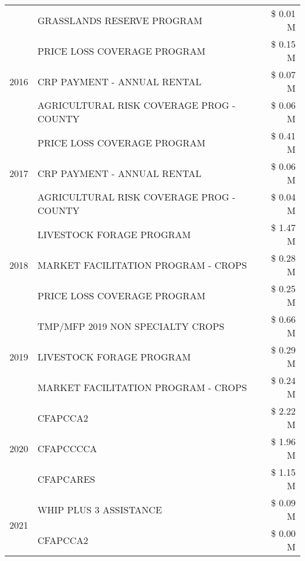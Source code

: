 \begin{tabular}{llr}
 & GRASSLANDS RESERVE PROGRAM & \$ 0.01 M \\
\cline{1-3}
\multirow[t]{3}{*}{2016} & PRICE LOSS COVERAGE PROGRAM & \$ 0.15 M \\
 & CRP PAYMENT - ANNUAL RENTAL & \$ 0.07 M \\
 & AGRICULTURAL RISK COVERAGE PROG - COUNTY & \$ 0.06 M \\
\cline{1-3}
\multirow[t]{3}{*}{2017} & PRICE LOSS COVERAGE PROGRAM & \$ 0.41 M \\
 & CRP PAYMENT - ANNUAL RENTAL & \$ 0.06 M \\
 & AGRICULTURAL RISK COVERAGE PROG - COUNTY & \$ 0.04 M \\
\cline{1-3}
\multirow[t]{3}{*}{2018} & LIVESTOCK FORAGE PROGRAM & \$ 1.47 M \\
 & MARKET FACILITATION PROGRAM - CROPS & \$ 0.28 M \\
 & PRICE LOSS COVERAGE PROGRAM & \$ 0.25 M \\
\cline{1-3}
\multirow[t]{3}{*}{2019} & TMP/MFP 2019 NON SPECIALTY CROPS & \$ 0.66 M \\
 & LIVESTOCK FORAGE PROGRAM & \$ 0.29 M \\
 & MARKET FACILITATION PROGRAM - CROPS & \$ 0.24 M \\
\cline{1-3}
\multirow[t]{3}{*}{2020} & CFAPCCA2 & \$ 2.22 M \\
 & CFAPCCCCA & \$ 1.96 M \\
 & CFAPCARES & \$ 1.15 M \\
\cline{1-3}
\multirow[t]{2}{*}{2021} & WHIP PLUS 3 ASSISTANCE & \$ 0.09 M \\
 & CFAPCCA2 & \$ 0.00 M \\
\cline{1-3}
\bottomrule
\end{tabular}
